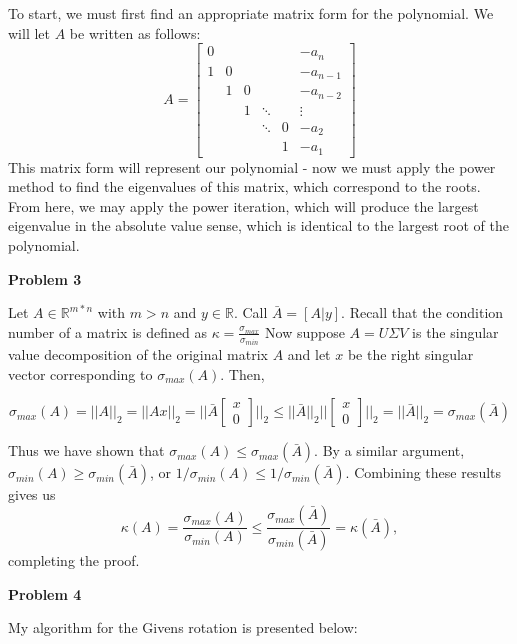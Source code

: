 \documentclass{article}
\def\R{\mathbb{R}}
\newcommand{\Problem}[1]{\textbf{\large Problem #1}}
\begin{document}
To start, we must first find an appropriate matrix form for the polynomial. 
We will let $A$ be written as follows:
\begin{equation*}
A = \begin{bmatrix}
 0 & & & & & - a_n \\
 1 & 0 & & & & -a_{n-1} \\
 & 1 & 0 & & & - a_{n-2} \\
 & & 1 & \ddots & & \vdots\\
 & & & \ddots & 0 & -a_2 \\
 & & & & 1 & -a_1	
 \end{bmatrix}
\end{equation*}
This matrix form will represent our polynomial - now we must apply the power method to find the eigenvalues of this matrix, which correspond to the roots. 
From here, we may apply the power iteration, which will produce the largest eigenvalue in the absolute value sense, which is identical to the largest root of the polynomial. 

\Problem{3}

Let $A \in \R^{m*n}$ with $m > n$ and $y \in \R$. 
Call $\bar{A} = [A | y]$. 
Recall that the condition number of a matrix is defined as $\kappa = \frac{\sigma_{max}}{\sigma_{min}}$
Now suppose $A = U\Sigma V$ is the singular value decomposition of the original matrix $A$ and let $x$ be the right singular vector corresponding to $\sigma_{max}(A)$. Then, 

$$\sigma_{max}(A) = ||A||_2 = ||Ax||_2 = ||\bar{A}\begin{bmatrix} x \\ 0 \end{bmatrix}||_2 \leq ||\bar{A}||_2||\begin{bmatrix} x \\ 0 \end{bmatrix}||_2 = ||\bar{A}||_2 = \sigma_{max}(\bar{A})$$

Thus we have shown that $\sigma_{max}(A) \leq \sigma_{max}(\bar{A})$. 
By a similar argument, $\sigma_{min}(A) \geq \sigma_{min}(\bar{A})$, or $1 / \sigma_{min}(A) \leq 1 / \sigma_{min}(\bar{A})$.
Combining these results gives us 
$$\kappa(A) = \frac{\sigma_{max}(A)}{\sigma_{min}(A)} \leq \frac{\sigma_{max}(\bar{A})}{\sigma_{min}(\bar{A})} = \kappa(\bar{A}),$$ completing the proof. 

\Problem{4}

My algorithm for the Givens rotation is presented below:


\end{document}
